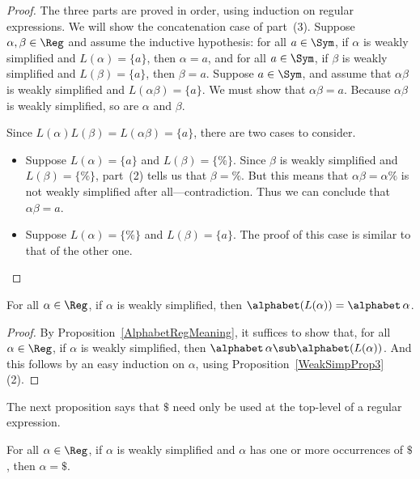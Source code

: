 \begin{proof}
The three parts are proved in order, using induction on regular
expressions.  We will show the concatenation case of part~(3).
Suppose $\alpha,\beta\in\Reg$ and assume the inductive hypothesis: for
all $a\in\Sym$, if $\alpha$ is weakly simplified and
$L(\alpha)=\{a\}$, then $\alpha=a$, and for all $a\in\Sym$, if $\beta$
is weakly simplified and $L(\beta)=\{a\}$, then $\beta=a$.  Suppose
$a\in\Sym$, and assume that $\alpha\beta$ is weakly simplified and
$L(\alpha\beta)=\{a\}$.  We must show that $\alpha\beta=a$.
Because $\alpha\beta$ is weakly simplified, so are $\alpha$ and $\beta$.

Since $L(\alpha)L(\beta)=L(\alpha\beta)=\{a\}$, there are two cases to
consider.
\begin{itemize}
\item Suppose $L(\alpha)=\{a\}$ and $L(\beta)=\{\%\}$.  Since $\beta$
  is weakly simplified and $L(\beta)=\{\%\}$, part~(2) tells us that
  $\beta=\%$.  But this means that $\alpha\beta=\alpha\%$ is not
  weakly simplified after all---contradiction.  Thus we can conclude
  that $\alpha\beta=a$.

\item Suppose $L(\alpha)=\{\%\}$ and $L(\beta)=\{a\}$.  The proof of
  this case is similar to that of the other one.
\end{itemize}
\end{proof}

\begin{proposition}
\label{WeakSimpProp2}
For all $\alpha\in\Reg$, if $\alpha$ is weakly simplified, then
$\alphabet(L(\alpha)) = \alphabet\,\alpha$.
\end{proposition}

\begin{proof}
By Proposition~\ref{AlphabetRegMeaning}, it suffices to show that,
for all $\alpha\in\Reg$, if $\alpha$ is weakly simplified, then
$\alphabet\,\alpha\sub\alphabet(L(\alpha))$.  And this
follows by an easy induction on $\alpha$, using
Proposition~\ref{WeakSimpProp3}(2).
\end{proof}

The next proposition says that $\$$ need only be used at the 
top-level of a regular expression.

\begin{proposition}
\label{WeakSimpProp4}
For all $\alpha\in\Reg$, if $\alpha$ is weakly simplified and $\alpha$ has
one or more occurrences of $\$$, then $\alpha=\$$.
\end{proposition}

